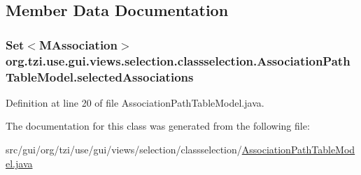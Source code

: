 \subsection{Member Data Documentation}
\hypertarget{classorg_1_1tzi_1_1use_1_1gui_1_1views_1_1selection_1_1classselection_1_1_association_path_table_model_aee306f646a28db90a54355b9e1a99362}{
\subsubsection[{selected\-Associations}]{\setlength{\rightskip}{0pt plus 5cm}Set$<${\bf M\-Association}$>$ org.\-tzi.\-use.\-gui.\-views.\-selection.\-classselection.\-Association\-Path\-Table\-Model.\-selected\-Associations\hspace{0.3cm}{\ttfamily [protected]}}}\label{classorg_1_1tzi_1_1use_1_1gui_1_1views_1_1selection_1_1classselection_1_1_association_path_table_model_aee306f646a28db90a54355b9e1a99362}


Definition at line 20 of file Association\-Path\-Table\-Model.\-java.



The documentation for this class was generated from the following file\-:\begin{DoxyCompactItemize}
\item 
src/gui/org/tzi/use/gui/views/selection/classselection/\hyperlink{_association_path_table_model_8java}{Association\-Path\-Table\-Model.\-java}\end{DoxyCompactItemize}
